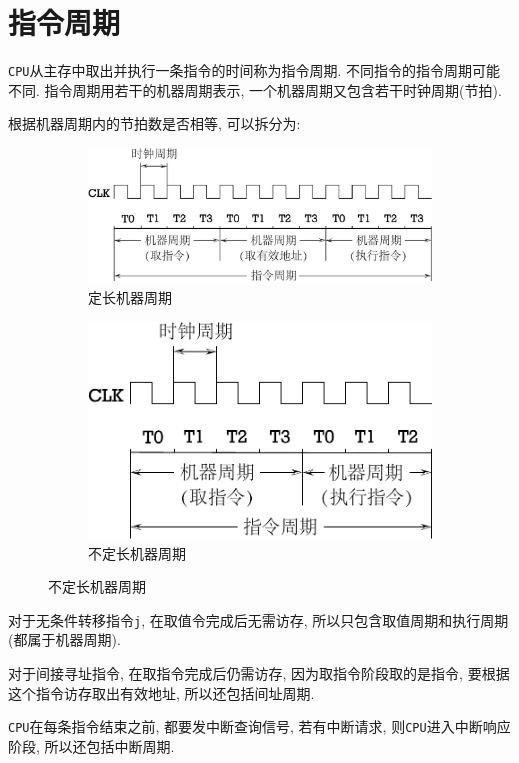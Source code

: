 \section{指令周期}
\verb|CPU|从主存中取出并执行一条指令的时间称为指令周期. 不同指令的指令周期可能不同. 指令周期用若干的机器周期表示, 一个机器周期又包含若干时钟周期(节拍).\par 根据机器周期内的节拍数是否相等, 可以拆分为:
\begin{figure}[H]
\centering
\begin{subfigure}{.48\textwidth}
\centering
\includegraphics[scale=.4]{img/figure21.pdf}
\caption{定长机器周期}
\end{subfigure}
\begin{subfigure}{.48\textwidth}
\centering
\includegraphics[scale=.4]{img/figure22.pdf}
\caption{不定长机器周期}
\end{subfigure}
\end{figure}
对于无条件转移指令\verb|j|, 在取值令完成后无需访存, 所以只包含取值周期和执行周期(都属于机器周期). \par
对于间接寻址指令, 在取指令完成后仍需访存, 因为取指令阶段取的是指令, 要根据这个指令访存取出有效地址, 所以还包括间址周期. \par
\verb|CPU|在每条指令结束之前, 都要发中断查询信号, 若有中断请求, 则\verb|CPU|进入中断响应阶段, 所以还包括中断周期. \par
